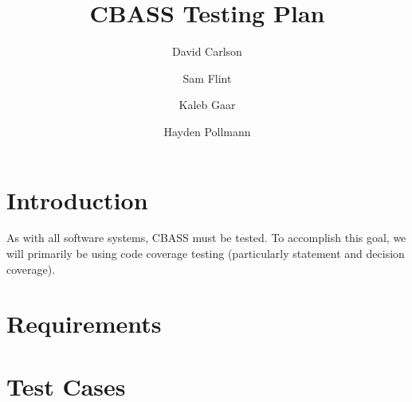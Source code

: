 \documentclass[10pt]{article}
\title{CBASS Testing Plan}
\author{David Carlson \and Sam Flint \and Kaleb Gaar \and Hayden
  Pollmann}
\begin{document}
\maketitle

\section{Introduction}

As with all software systems, CBASS must be tested.  To accomplish
this goal, we will primarily be using code coverage testing
(particularly statement and decision coverage).

\section{Requirements}

\section{Test Cases}
\end{document}
